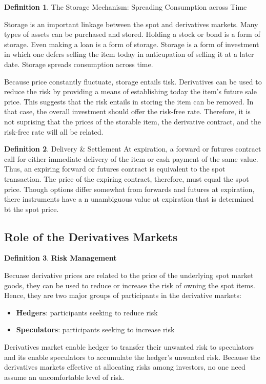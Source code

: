 \documentclass{book}
\theoremstyle{definition}
\newtheorem{definition}{Definition}[section]
\theoremstyle{remark}
\begin{document}
        \begin{definition}{The Storage Mechanism: Spreading Consumption across Time}
        
            Storage is an important linkage between the spot and derivatives markets. Many types of assets can be purchased and stored. Holding a stock or bond is a form of storage. Even making a loan is a form of storage. Storage is a form of investment in which one defers selling the item today in anticupation of selling it at a later date. Storage spreads consumption across time. 
            
            Because price constantly fluctuate, storage entails tisk. Derivatives can be used to reduce the risk by providing a means of establishing today the item's future sale price. This suggests that the risk entails in storing the item can be removed. In that case, the overall investment should offer the risk-free rate. Therefore, it is not suprising that the prices of the storable item, the derivative contract, and the risk-free rate will all be related. 
        \end{definition}
    
        \begin{definition}{Delivery \& Settlement}
            At expiration, a forward or futures contract call for either immediate delivery of the item or cash payment of the same value. Thus, an expiring forward or futures contract is equivalent to the spot transaction. The price of the expiring contract, therefore, must equal the spot price. Though options differ somewhat from forwards and futures at expiration, there instruments have a n unambiguous value at expiration that is determined bt the spot price. 
        
        \end{definition}
        
    \newpage    
    \subsection{Role of the Derivatives Markets}
        \begin{definition}{\textbf{Risk Management}}
            
            Becuase derivative prices are related to the price of the underlying spot market goods, they can be used to reduce or increase the risk of owning the spot items. Hence, they are two major groups of participants in the derivative markets: 
                \begin{itemize}
                    \item \textbf{Hedgers}: participants seeking to reduce risk
                    \item \textbf{Speculators}: participants seeking to increase risk
                \end{itemize}
        \end{definition}
            Derivatives market enable hedger to transfer their unwanted risk to speculators and its enable speculators to accumulate the hedger's unwanted risk. Because the derivatives markets effective at allocating risks among investors, no one need assume an uncomfortable level of risk.
            
\end{document}
